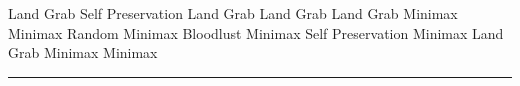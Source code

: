 \documentclass[a4wide, 11pt]{article}
\begin{document}
\textbar{} \textbar{} \textbar{} \textbar{} \textbar{} \textbar{}
\textbar{}Land Grab \textbar{}Self Preservation\textbar{} \textbar{}
\textbar{} \textbar{} \textbar{} \textbar{} \textbar{} \textbar{}Land
Grab \textbar{}Land Grab \textbar{} \textbar{} \textbar{} \textbar{}
\textbar{} \textbar{} \textbar{} \textbar{}Land Grab \textbar{}Minimax
\textbar{} \textbar{} \textbar{} \textbar{} \textbar{} \textbar{}
\textbar{} \textbar{}Minimax \textbar{}Random \textbar{} \textbar{}
\textbar{} \textbar{} \textbar{} \textbar{} \textbar{} \textbar{}Minimax
\textbar{}Bloodlust \textbar{} \textbar{} \textbar{} \textbar{}
\textbar{} \textbar{} \textbar{} \textbar{}Minimax \textbar{}Self
Preservation\textbar{} \textbar{} \textbar{} \textbar{} \textbar{}
\textbar{} \textbar{} \textbar{}Minimax \textbar{}Land Grab \textbar{}
\textbar{} \textbar{} \textbar{} \textbar{} \textbar{} \textbar{}
\textbar{}Minimax \textbar{}Minimax \textbar{} \textbar{} \textbar{}
\textbar{} \textbar{} \textbar{} \textbar{}

\begin{center}\rule{3in}{0.4pt}\end{center}
\end{document}
